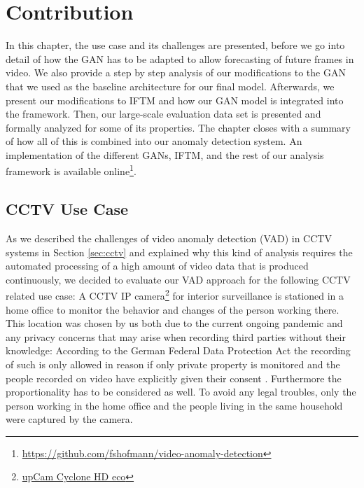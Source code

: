 \chapter{Contribution} \label{chap:contribution} %

In this chapter, the use case and its challenges are presented, before we go into detail of how the GAN has to be adapted to allow forecasting of future frames in video. We also provide a step by step analysis of our modifications to the GAN that we used as the baseline architecture for our final model. Afterwards, we present our modifications to IFTM and how our GAN model is integrated into the framework. Then, our large-scale evaluation data set is presented and formally analyzed for some of its properties. The chapter closes with a summary of how all of this is combined into our anomaly detection system. An implementation of the different GANs, IFTM, and the rest of our analysis framework is available online\footnote{\url{https://github.com/fshofmann/video-anomaly-detection}}.



\section{CCTV Use Case} \label{sec:use_case}

As we described the challenges of video anomaly detection (VAD) in CCTV systems in Section \ref{sec:cctv} and explained why this kind of analysis requires the automated processing of a high amount of video data that is produced continuously, we decided to evaluate our VAD approach for the following CCTV related use case: A CCTV IP camera\footnote{\href{https://www.upcam.de/en/ip-cameras/upcam-cyclone-indoor/upcam-cyclone-hd-eco/176/upcam-cyclone-hd-eco-black-all-in-one-surveillance-camera}{upCam Cyclone HD eco}} for interior surveillance is stationed in a home office to monitor the behavior and changes of the person working there. This location was chosen by us both due to the current ongoing pandemic  and any privacy concerns that may arise when recording third parties without their knowledge: According to the German Federal Data Protection Act the recording of such is only allowed in reason if only private property is monitored and the people recorded on video have explicitly given their consent \cite{brd2017fdpa}. Furthermore the proportionality has to be considered as well. To avoid any legal troubles, only the person working in the home office and the people living in the same household were captured by the camera.

